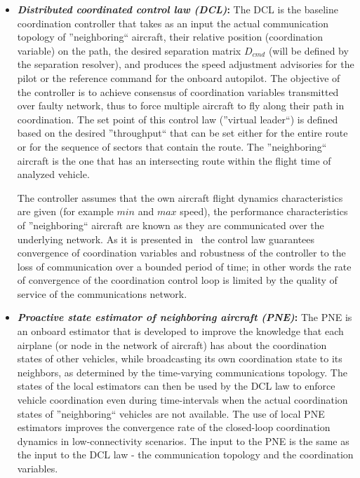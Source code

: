 \documentclass[letter,onecolumn,12pt]{aiaa-tc}
\newcommand{\1}{1_n}
\begin{document}
\begin{itemize}
\setlength{\itemsep}{-1pt}
\vspace{-2mm}

\item \textbf{\emph{Distributed coordinated control law (DCL)}:} The DCL is the baseline coordination controller that takes as an input the actual communication topology of ''neighboring`` aircraft, their relative position (coordination variable) on the path, the desired separation matrix $D_{cmd}$ (will be defined by the separation resolver),  and produces the speed adjustment advisories for the pilot or the reference command for the onboard autopilot. The objective of the controller is to achieve consensus of coordination variables transmitted over faulty network, thus to force multiple aircraft to fly along their path in coordination. The set point of this control law (''virtual leader``) is defined based on the desired ''throughput`` that can be set either for the entire route or for the sequence of sectors that contain the route.  The ''neighboring`` aircraft is the one that has an intersecting route within the flight time of analyzed vehicle.

The controller assumes that the own aircraft flight dynamics characteristics are given (for example $min$ and $max$ speed), the performance characteristics of ''neighboring`` aircraft are known as they are communicated over the underlying network. As it is presented in~\cite{CSM12_CPF} the control law guarantees convergence of coordination variables and robustness of the controller to the loss of communication over a bounded period of time; in other words the rate of convergence of the coordination control loop is limited by the quality of service of the communications network.

\item \textbf{\emph{Proactive state estimator of neighboring aircraft (PNE)}:} The PNE is an onboard estimator that is developed to improve the knowledge that each airplane (or node in the network of aircraft) has about the coordination states of other vehicles, while  broadcasting its own coordination state to its neighbors, as determined by the time-varying communications topology. The states of the local estimators can then be used by the DCL law to enforce vehicle coordination even during time-intervals when the actual coordination states of ''neighboring`` vehicles are not available. The use of local PNE estimators improves the convergence rate of the closed-loop coordination dynamics in low-connectivity scenarios. The input to the PNE is the same as the input to the DCL law - the communication topology and the coordination variables.


\end{itemize}
\end{document}
